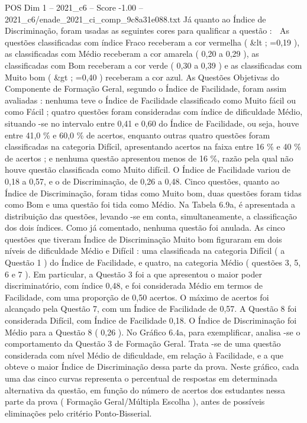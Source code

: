 \begin{textsample}{POS Dim 1 – 2021\_c6 – Score -1.00 – 2021\_c6/enade\_2021\_ci\_comp\_9c8a31e088.txt}
Já quanto ao Índice de Discriminação, foram usadas as seguintes cores para qualificar a questão :  As questões classificadas com índice Fraco receberam a cor vermelha ( \&lt ; =0,19 ), as classificadas com Médio receberam a cor amarela ( 0,20 a 0,29 ), as classificadas com Bom receberam a cor verde ( 0,30 a 0,39 ) e as classificadas com Muito bom ( \&gt ; =0,40 ) receberam a cor azul.
As Questões Objetivas do Componente de Formação Geral, segundo o Índice de Facilidade, foram assim avaliadas : nenhuma teve o Índice de Facilidade classificado como Muito fácil ou como Fácil ; quatro questões foram consideradas com índice de dificuldade Médio, situando -se no intervalo entre 0,41 e 0,60 do Índice de Facilidade, ou seja, houve entre 41,0 \% e 60,0 \% de acertos, enquanto outras quatro questões foram classificadas na categoria Difícil, apresentando acertos na faixa entre 16 \% e 40 \% de acertos ; e nenhuma questão apresentou menos de 16 \%, razão pela qual não houve questão classificada como Muito difícil.
O Índice de Facilidade variou de 0,18 a 0,57, e o de Discriminação, de 0,26 a 0,48.
Cinco questões, quanto ao Índice de Discriminação, foram tidas como Muito bom, duas questões foram tidas como Bom e uma questão foi tida como Médio.
Na Tabela 6.9a, é apresentada a distribuição das questões, levando -se em conta, simultaneamente, a classificação dos dois índices.
Como já comentado, nenhuma questão foi anulada.
As cinco questões que tiveram Índice de Discriminação Muito bom figuraram em dois níveis de dificuldade Médio e Difícil : uma classificada na categoria Difícil ( a Questão 1 ) do Índice de Facilidade, e quatro, na categoria Médio ( questões 3, 5, 6 e 7 ).
Em particular, a Questão 3 foi a que apresentou o maior poder discriminatório, com índice 0,48, e foi considerada Médio em termos de Facilidade, com uma proporção de 0,50 acertos.
O máximo de acertos foi alcançado pela Questão 7, com um Índice de Facilidade de 0,57.
A Questão 8 foi considerada Difícil, com Índice de Facilidade 0,18.
O Índice de Discriminação foi Médio para a Questão 8 ( 0,26 ).
No Gráfico 6.4a, para exemplificar, analisa -se o comportamento da Questão 3 de Formação Geral.
Trata -se de uma questão considerada com nível Médio de dificuldade, em relação à Facilidade, e a que obteve o maior Índice de Discriminação dessa parte da prova.
Neste gráfico, cada uma das cinco curvas representa o percentual de respostas em determinada alternativa da questão, em função do número de acertos dos estudantes nessa parte da prova ( Formação Geral/Múltipla Escolha ), antes de possíveis eliminações pelo critério Ponto-Bisserial.

\end{textsample}
